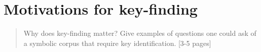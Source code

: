 \chapter{Motivations for key-finding}
\label{chap:chap50}

\begin{quote}
    Why does key-finding matter? Give examples of questions one could ask of a symbolic corpus that require key identification. [3-5 pages]
\end{quote}
\clearpage








